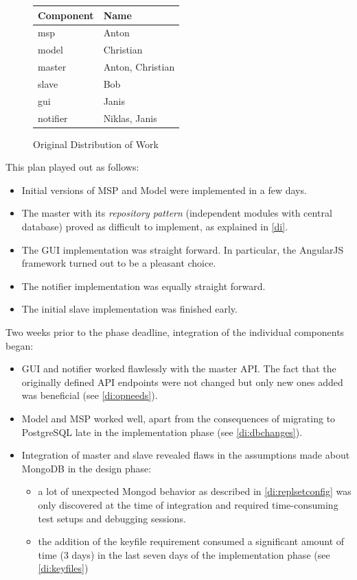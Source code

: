 \begin{figure}[h]
\centering
\begin{tabular}{l|l}
        Component & Name\\
        \hline
        msp       & Anton\\
        model     & Christian\\
        master    & Anton, Christian\\
        slave     & Bob\\
        gui       & Janis\\
        notifier  & Niklas, Janis\\
\end{tabular}
\caption{Original Distribution of Work}
\end{figure}

This plan played out as follows:

\begin{itemize}
\item Initial versions of MSP and Model were implemented in a few days.
\item The master with its \textit{repository pattern} (independent modules with central database) proved as difficult to implement, as
      explained in \ref{di}.
\item The GUI implementation was straight forward. In particular, the AngularJS framework turned out to be a pleasant choice.
\item The notifier implementation was equally straight forward.
\item The initial slave implementation was finished early.
\end{itemize}

Two weeks prior to the phase deadline, integration of the individual components began:

\begin{itemize}
\item GUI and notifier worked flawlessly with the master API. The fact that the originally defined API endpoints were not changed
                but only new ones added was beneficial (see \ref{di:opneeds}).
\item Model and MSP worked well, apart from the consequences of migrating to PostgreSQL late in the implementation phase
        (see \ref{di:dbchanges}).
\item Integration of master and slave revealed flaws in the assumptions made about MongoDB in the design phase:
        \begin{itemize}
                \item a lot of unexpected Mongod behavior as described in \ref{di:replsetconfig} was only discovered at the
                        time of integration and required time-consuming test setups and debugging sessions.
                \item the addition of the keyfile requirement consumed a significant amount of time (3 days) in the
                       last seven days of the implementation phase (see \ref{di:keyfiles})
        \end{itemize}
\end{itemize}

